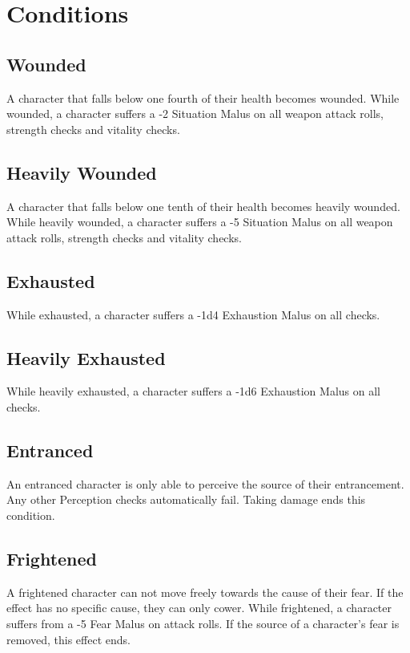 \chapter{Conditions}\label{ch:conditions}
\section{Wounded}\label{condition:wounded}
A character that falls below one fourth of their health becomes wounded.
While wounded, a character suffers a -2 Situation Malus on all weapon attack rolls, strength checks and vitality checks.

\section{Heavily Wounded}\label{condition:heavilyWounded}
A character that falls below one tenth of their health becomes heavily wounded.
While heavily wounded, a character suffers a -5 Situation Malus on all weapon attack rolls, strength checks and vitality checks.

\section{Exhausted}\label{condition:exhausted}
While exhausted, a character suffers a -1d4 Exhaustion Malus on all checks.

\section{Heavily Exhausted}\label{condition:heavilyExhausted}
While heavily exhausted, a character suffers a -1d6 Exhaustion Malus on all checks.

\section{Entranced}\label{condition:entranced}
An entranced character is only able to perceive the source of their entrancement.
Any other Perception checks automatically fail.
Taking damage ends this condition.

\section{Frightened}\label{condition:frightened}
A frightened character can not move freely towards the cause of their fear.
If the effect has no specific cause, they can only cower.
While frightened, a character suffers from a -5 Fear Malus on attack rolls.
If the source of a character's fear is removed, this effect ends.

